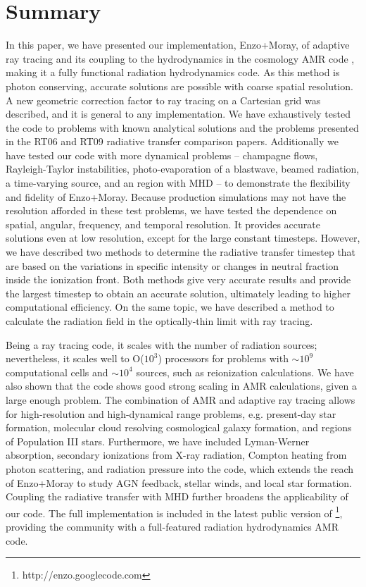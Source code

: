 \documentclass[useAMS,usenatbib]{mn2e}
\begin{document}
\section{Summary}

In this paper, we have presented our implementation, Enzo+Moray, of
adaptive ray tracing \citep{Abel02_RT} and its coupling to the
hydrodynamics in the cosmology AMR code \enzo, making it a fully
functional radiation hydrodynamics code.  As this method is photon
conserving, accurate solutions are possible with coarse spatial
resolution.  A new geometric correction factor to ray tracing on a
Cartesian grid was described, and it is general to any implementation.
We have exhaustively tested the code to problems with known analytical
solutions and the problems presented in the RT06 and RT09 radiative
transfer comparison papers.  Additionally we have tested our code with
more dynamical problems -- champagne flows, Rayleigh-Taylor
instabilities, photo-evaporation of a blastwave, beamed radiation, a
time-varying source, and an \hii region with MHD -- to
demonstrate the flexibility and fidelity of Enzo+Moray.  Because
production simulations may not have the resolution afforded in these
test problems, we have tested the dependence on spatial, angular,
frequency, and temporal resolution.  It provides accurate solutions
even at low resolution, except for the large constant timesteps.
However, we have described two methods to determine the radiative
transfer timestep that are based on the variations in specific
intensity or changes in neutral fraction inside the ionization front.
Both methods give very accurate results and provide the largest
timestep to obtain an accurate solution, ultimately leading to higher
computational efficiency.  On the same topic, we have described a
method to calculate the radiation field in the optically-thin limit
with ray tracing.

Being a ray tracing code, it scales with the number of radiation
sources; nevertheless, it scales well to O($10^3$) processors for
problems with $\sim10^9$ computational cells and $\sim10^4$ sources,
such as reionization calculations.  We have also shown that the code
shows good strong scaling in AMR calculations, given a large enough
problem.  The combination of AMR and adaptive ray tracing allows for
high-resolution and high-dynamical range problems, e.g. present-day
star formation, molecular cloud resolving cosmological galaxy
formation, and \hii regions of Population III stars.  Furthermore, we
have included Lyman-Werner absorption, secondary ionizations from
X-ray radiation, Compton heating from photon scattering, and radiation
pressure into the code, which extends the reach of Enzo+Moray to study
AGN feedback, stellar winds, and local star formation.  Coupling the
radiative transfer with MHD further broadens the applicability of our
code.  The full implementation is included in the latest public
version of \enzo\footnote{http://enzo.googlecode.com}, providing the
community with a full-featured radiation hydrodynamics AMR code.
\end{document}
